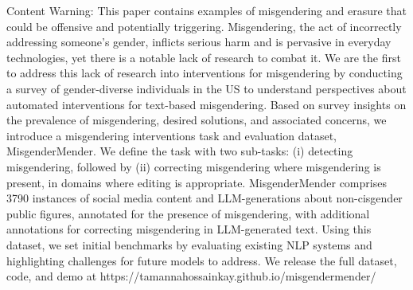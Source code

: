 Content Warning: This paper contains examples of misgendering and erasure that could be offensive and potentially triggering. Misgendering, the act of incorrectly addressing someone's gender, inflicts serious harm and is pervasive in everyday technologies, yet there is a notable lack of research to combat it. We are the first to address this lack of research into interventions for misgendering by conducting a survey of gender-diverse individuals in the US to understand perspectives about automated interventions for text-based misgendering. Based on survey insights on the prevalence of misgendering, desired solutions, and associated concerns, we introduce a misgendering interventions task and evaluation dataset, MisgenderMender. We define the task with two sub-tasks: (i) detecting misgendering, followed by (ii) correcting misgendering where misgendering is present, in domains where editing is appropriate. MisgenderMender comprises 3790 instances of social media content and LLM-generations about non-cisgender public figures, annotated for the presence of misgendering, with additional annotations for correcting misgendering in LLM-generated text. Using this dataset, we set initial benchmarks by evaluating existing NLP systems and highlighting challenges for future models to address. We release the full dataset, code, and demo at https://tamannahossainkay.github.io/misgendermender/